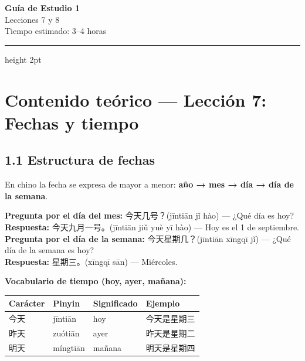 \documentclass[12pt, a4paper]{article}
\begin{document}
\begin{center}
{\LARGE \textbf{\textcolor{azul}{Guía de Estudio 1}}}\\[4pt]
{\large Lecciones 7 y 8}\\[2pt]
{\normalsize Tiempo estimado: 3--4 horas}
\end{center}

\vspace{0.5em}
\hrule height 2pt
\vspace{1em}

\section{Contenido teórico — Lección 7: Fechas y tiempo}

\subsection{1.1 Estructura de fechas}

En chino la fecha se expresa de mayor a menor: \textbf{año → mes → día → día de la semana}.

\begin{cuadroazul}
\textbf{Pregunta por el día del mes:} \quad 今天几号？\quad (jīntiān jǐ hào) — ¿Qué día es hoy?\\[4pt]
\textbf{Respuesta:} \quad 今天九月一号。\quad (jīntiān jiǔ yuè yī hào) — Hoy es el 1 de septiembre.\\[6pt]
\textbf{Pregunta por el día de la semana:} \quad 今天星期几？\quad (jīntiān xīngqī jǐ) — ¿Qué día de la semana es hoy?\\[4pt]
\textbf{Respuesta:} \quad 星期三。\quad (xīngqī sān) — Miércoles.
\end{cuadroazul}

\vspace{0.5em}
\noindent\textbf{Vocabulario de tiempo (hoy, ayer, mañana):}

\begin{center}
\begin{tabular}{llll}
\toprule
\textbf{Carácter} & \textbf{Pinyin} & \textbf{Significado} & \textbf{Ejemplo} \\
\midrule
今天 & jīntiān & hoy & 今天是星期三 \\
昨天 & zuótiān & ayer & 昨天是星期二 \\
明天 & míngtiān & mañana & 明天是星期四 \\
\bottomrule
\end{tabular}
\end{center}
\end{document}
